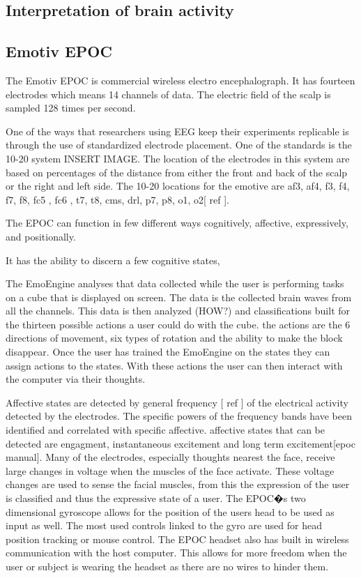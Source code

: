 \subsection {Interpretation of brain activity}


\subsection{Emotiv EPOC}
The Emotiv EPOC is commercial wireless electro encephalograph. It has fourteen electrodes which means 14 channels 
of data. The electric field of the scalp is sampled 128 times per second.

One of the ways that researchers using EEG keep their experiments replicable is through the use of standardized 
electrode placement. One of the standards is the 10-20\cite{} system INSERT IMAGE.
The location of the electrodes in this system are based on percentages of the distance from either the front and 
back of the scalp or the right and left side. The 10-20 locations for the emotive are 
af3, af4, f3, f4, f7, f8, fc5 , fc6 , t7, t8, cms, drl, p7, p8, o1, o2[ ref ].

The EPOC can function in few different ways cognitively, affective, expressively, and positionally.

It has the ability to discern a few cognitive states,

The EmoEngine analyses that data collected while the user is performing tasks on a cube that is displayed on screen. 
The data is the collected brain waves from all the channels. This data is then analyzed (HOW?) and classifications 
built for the thirteen possible actions a user could do with the cube. the actions are the 6 directions of movement, 
six types of rotation and the ability to make the block disappear. Once the user has trained the EmoEngine on the 
states they can assign actions to the states. With these actions the user can then interact with the computer via 
their thoughts.

Affective states are detected by general frequency [ ref ] of the electrical activity detected by the electrodes. The specific powers of the frequency bands have been identified and correlated with specific affective. affective states that can be detected are engagment, instantaneous excitement and long term excitement[epoc manual].
Many of the electrodes, especially thoughts nearest the face, receive large changes in voltage when the muscles of the face activate. These voltage changes are used to sense the facial muscles, from this the expression of the user is classified and thus the expressive state of a user.
The EPOC�s two dimensional gyroscope allows for the position of the users head to be used as input as well. The most used controls linked to the gyro are used for head position tracking or mouse control.
The EPOC headset also has built in wireless communication with the host computer. This allows for more freedom when the user or subject is wearing the headset as there are no wires to hinder them.

